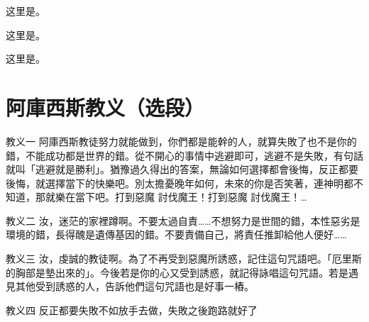 \documentclass{morelull}
\begin{document}
\begin{tiui}
    这里是。
\end{tiui}

\begin{tixk}
    这里是。
\end{tixk}

\begin{vuyi}
    这里是。
\end{vuyi}

\section{阿庫西斯教义（选段）}

\begin{dkli}{教义一}{}
    阿庫西斯教徒努力就能做到，你們都是能幹的人，就算失敗了也不是你的錯，不能成功都是世界的錯。從不開心的事情中逃避即可，逃避不是失敗，有句話就叫「逃避就是勝利」。猶豫過久得出的答案，無論如何選擇都會後悔，反正都要後悔，就選擇當下的快樂吧。別太擔憂晚年如何，未來的你是否笑著，連神明都不知道，那就樂在當下吧。打到惡魔 討伐魔王！打到惡魔 討伐魔王！…
\end{dkli}

\begin{jply}{教义二}{}
    汝，迷茫的家裡蹲啊。不要太過自責……不想努力是世間的錯，本性惡劣是環境的錯，長得醜是遺傳基因的錯。不要責備自己，將責任推卸給他人便好……
\end{jply}

\begin{mkti}{教义三}{}
    汝，虔誠的教徒啊。為了不再受到惡魔所誘惑，記住這句咒語吧。「厄里斯的胸部是墊出來的」。今後若是你的心又受到誘惑，就記得詠唱這句咒語。若是遇見其他受到誘惑的人，告訴他們這句咒語也是好事一樁。
\end{mkti}

\begin{dkyi}{教义四}{}
    反正都要失敗不如放手去做，失敗之後跑路就好了
\end{dkyi}
\end{document}
